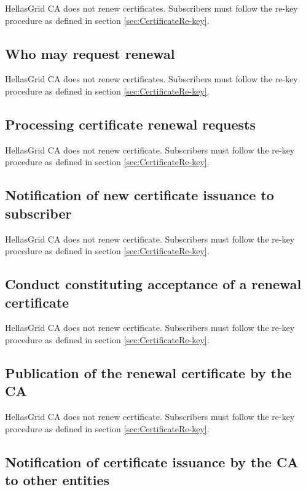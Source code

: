 HellasGrid CA does not renew certificates. Subscribers must follow the re-key procedure as defined in section \ref{sec:CertificateRe-key}.


\subsection{Who may request renewal}

HellasGrid CA does not renew certificates. Subscribers must follow the re-key procedure as defined in section \ref{sec:CertificateRe-key}.


\subsection{Processing certificate renewal requests}

HellasGrid CA does not renew certificate. Subscribers must follow the re-key procedure as defined in section \ref{sec:CertificateRe-key}.

\subsection{Notification of new certificate issuance to subscriber}

HellasGrid CA does not renew certificate. Subscribers must follow the re-key procedure as defined in section \ref{sec:CertificateRe-key}.

\subsection{Conduct constituting acceptance of a renewal certificate}

HellasGrid CA does not renew certificate. Subscribers must follow the re-key procedure as defined in section \ref{sec:CertificateRe-key}.

\subsection{Publication of the renewal certificate by the CA}

HellasGrid CA does not renew certificate. Subscribers must follow the re-key procedure as defined in section \ref{sec:CertificateRe-key}.

\subsection{Notification of certificate issuance by the CA to other entities}

